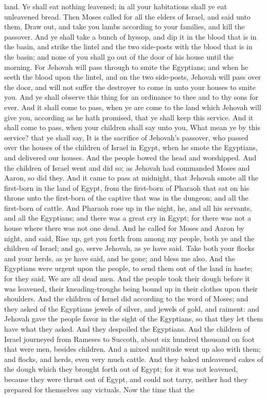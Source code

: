 land. Ye shall eat nothing leavened; in all your habitations shall ye eat unleavened bread.  Then Moses called for all the elders of Israel, and said unto them, Draw out, and take you lambs according to your families, and kill the passover. And ye shall take a bunch of hyssop, and dip it in the blood that is in the basin, and strike the lintel and the two side-posts with the blood that is in the basin; and none of you shall go out of the door of his house until the morning. For Jehovah will pass through to smite the Egyptians; and when he seeth the blood upon the lintel, and on the two side-posts, Jehovah will pass over the door, and will not suffer the destroyer to come in unto your houses to smite you. And ye shall observe this thing for an ordinance to thee and to thy sons for ever. And it shall come to pass, when ye are come to the land which Jehovah will give you, according as he hath promised, that ye shall keep this service. And it shall come to pass, when your children shall say unto you, What mean ye by this service? that ye shall say, It is the sacrifice of Jehovah’s passover, who passed over the houses of the children of Israel in Egypt, when he smote the Egyptians, and delivered our houses. And the people bowed the head and worshipped. And the children of Israel went and did so; as Jehovah had commanded Moses and Aaron, so did they.  And it came to pass at midnight, that Jehovah smote all the first-born in the land of Egypt, from the first-born of Pharaoh that sat on his throne unto the first-born of the captive that was in the dungeon; and all the first-born of cattle. And Pharaoh rose up in the night, he, and all his servants, and all the Egyptians; and there was a great cry in Egypt; for there was not a house where there was not one dead. And he called for Moses and Aaron by night, and said, Rise up, get you forth from among my people, both ye and the children of Israel; and go, serve Jehovah, as ye have said. Take both your flocks and your herds, as ye have said, and be gone; and bless me also. And the Egyptians were urgent upon the people, to send them out of the land in haste; for they said, We are all dead men. And the people took their dough before it was leavened, their kneading-troughs being bound up in their clothes upon their shoulders. And the children of Israel did according to the word of Moses; and they asked of the Egyptians jewels of silver, and jewels of gold, and raiment: and Jehovah gave the people favor in the sight of the Egyptians, so that they let them have what they asked. And they despoiled the Egyptians.  And the children of Israel journeyed from Rameses to Succoth, about six hundred thousand on foot that were men, besides children. And a mixed multitude went up also with them; and flocks, and herds, even very much cattle. And they baked unleavened cakes of the dough which they brought forth out of Egypt; for it was not leavened, because they were thrust out of Egypt, and could not tarry, neither had they prepared for themselves any victuals. Now the time that the 